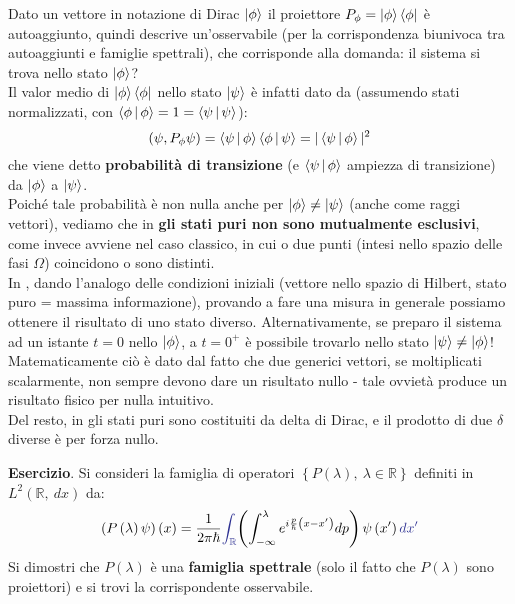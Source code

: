\documentclass[../../FisicaTeorica.tex]{subfiles}
\begin{document}
\begin{oss}
Dato un vettore in notazione di Dirac $\Ket{\phi}$ il proiettore $P_\phi =\Ket{\phi}\Bra{\phi}$ è autoaggiunto, quindi descrive un'osservabile (per la corrispondenza biunivoca tra autoaggiunti e famiglie spettrali), che corrisponde alla domanda: il sistema si trova nello stato $\Ket{\phi}$?\\
Il valor medio di $\Ket{\phi}\Bra{\phi}$ nello stato $\Ket{\psi}$ è infatti dato da (assumendo stati normalizzati, con $\Braket{\phi|\phi} = 1 = \Braket{\psi|\psi}$):
\[
(\psi, P_\phi \psi) = 
\Braket{\psi|\phi}\Braket{\phi|\psi} = |\Braket{\psi|\phi}|^2
\]
che viene detto \textbf{probabilità di transizione} (e $\Braket{\psi|\phi}$ ampiezza di transizione) da $\Ket{\phi}$ a $\Ket{\psi}$.\\
Poiché tale probabilità è non nulla anche per $\Ket{\phi}\neq\Ket{\psi}$ (anche come raggi vettori), vediamo che in \MQ \textbf{gli stati puri non sono mutualmente esclusivi}, come invece avviene nel caso classico, in cui o due punti (intesi nello spazio delle fasi $\Omega$) coincidono o sono distinti.\\
In \MQ, dando l'analogo delle condizioni iniziali (vettore nello spazio di Hilbert, stato puro = massima informazione), provando a fare una misura in generale possiamo ottenere il risultato di uno stato diverso. Alternativamente, se preparo il sistema ad un istante $t=0$ nello $\Ket{\phi}$, a $t=0^+$ è possibile trovarlo nello stato $\Ket{\psi}\neq\Ket{\phi}$!\\
Matematicamente ciò è dato dal fatto che due generici vettori, se moltiplicati scalarmente, non sempre devono dare un risultato nullo - tale ovvietà produce un risultato fisico per nulla intuitivo.\\
Del resto, in \MC gli stati puri sono costituiti da delta di Dirac, e il prodotto di due $\delta$ diverse è per forza nullo.
\end{oss}
\textbf{Esercizio}.  Si consideri la famiglia di operatori $\left\{P\left(\lambda\right),\ \lambda\in\mathbb{R}\right\}$ definiti in $L^2\left(\mathbb{R},\ dx\right)$ da:
\[
\left(P\left(\lambda\right)\psi\right)\left(x\right)=\frac{1}{2\pi\hbar}\textcolor{Blue}{\int_{\mathbb{R}}}{\left(\int_{-\infty}^{\lambda}e^{i\frac{p}{\hbar}\left(x-x'\right)}dp\right)\psi\left(x'\right)\textcolor{Blue}{dx'}}
\]
Si dimostri che $P\left(\lambda\right)$ è una \textbf{famiglia spettrale} (solo il fatto che $P\left(\lambda\right)$ sono proiettori) e si trovi la corrispondente osservabile.\\
\end{document}
